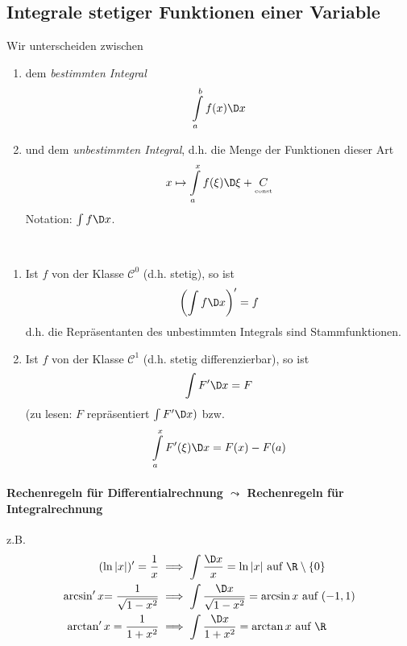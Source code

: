 \newpage
\appendix
\subsection*{Integrale stetiger Funktionen einer Variable} %
Wir unterscheiden zwischen
\begin{enumerate}[- ,topsep =-3pt]
	\item dem \emph{bestimmten Integral}
				$$ \int\limits_a^b f(x)\D x$$
	\item und dem \emph{unbestimmten Integral}, d.h. die Menge der Funktionen dieser Art
	$$x \mapsto \int\limits_a^x f(\xi) \D \xi + \underset{\text{\tiny const}}C$$
	Notation: $\int f \D x$.
\end{enumerate}

\begin{satz}  \begin{mdframed} \
\begin{enumerate}[(\roman*), topsep = -1 pt]
	\item Ist $f$ von der Klasse $\mathcal{C}^0$ (d.h. stetig), so ist 
		$$\left(\int f \D x\right)' = f$$
		d.h. die Repräsentanten des unbestimmten Integrals sind Stammfunktionen.
	\item Ist $f$ von der Klasse $\mathcal{C}^1$ (d.h. stetig differenzierbar), so ist
	$$ \int F' \D x =F$$
	(zu lesen: $F$ repräsentiert $\int F' \D x)$ bzw.
	$$ \int\limits_a^x F'(\xi) \D x = F(x) -F(a)$$
\end{enumerate}
\end{mdframed}
\end{satz}

\paragraph{Rechenregeln für Differentialrechnung $\leadsto$ Rechenregeln für Integralrechnung}z.B.
\begin{equation*}
	\begin{split}
		(\ln |x|)' = \frac{1}{x} & \implies \int \frac{\D x}{x} = \ln |x| \text{ auf } \R\setminus\{0\}\\
		\arcsin' x {=\frac{1}{\sqrt{1-x^2}}} & \implies \int \frac{\D x}{\sqrt{1-x^2}} = \arcsin x \text{ auf } (-1,1) \\ 		
		\arctan' x = \frac{1}{1+x^2} & \implies \int \frac{\D x}{1+x^2} = \arctan x \text{ auf }\R
	\end{split}
\end{equation*}
